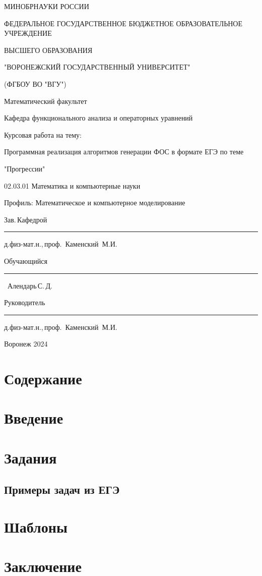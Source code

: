 \documentclass[oneside,final,12pt]{extarticle} %
\begin{document}
\begin{titlepage}
\centerline{МИНОБРНАУКИ РОССИИ}
\centerline{ФЕДЕРАЛЬНОЕ ГОСУДАРСТВЕННОЕ БЮДЖЕТНОЕ ОБРАЗОВАТЕЛЬНОЕ УЧРЕЖДЕНИЕ}
\centerline{ВЫСШЕГО ОБРАЗОВАНИЯ}
\centerline{"ВОРОНЕЖСКИЙ ГОСУДАРСТВЕННЫЙ УНИВЕРСИТЕТ"}
\centerline{(ФГБОУ ВО "ВГУ")}
\vfill
\centerline{Математический факультет}
\centerline{Кафедра функционального анализа и операторных уравнений}
\vfill
\centerline{Курсовая работа на тему:}
\centerline{Программная реализация алгоритмов генерации ФОС в формате ЕГЭ по теме}
\centerline{"Прогрессии"}
\centerline{02.03.01 Математика и компьютерные науки}
\centerline{Профиль: Математическое и компьютерное моделирование}
\vfill
\null\hfill
\begin{minipage}{0.85\textwidth}
	Зав.\,Кафедрой\,
	\rule{1.5cm}{0.25pt} д.физ-мат.н.,\,проф.\, Каменский~М.И.
	\par
	\medskip
	Обучающийся\,
	\rule{1.5cm}{0.25pt} \qquad\qquad\qquad\qquad\quad\quad\ Алендарь\,С.\,Д.
	\par
	\medskip
	Руководитель\,
	\rule{1.5cm}{0.25pt} д.физ-мат.н.,\,проф.\, Каменский~М.И.
	\par
	\medskip
\end{minipage}
\vfill
\centerline{Воронеж 2024}
\end{titlepage}
\setcounter{page}{2}

\section*{Содержание}
\newpage

\section*{Введение}
\newpage

\section{Задания}
\subsection{Примеры задач из ЕГЭ}
\newpage
\section{Шаблоны}
\newpage

\section*{Заключение}
\newpage

\begin{thebibliography}[]

\end{thebibliography}
\newpage
\appendix
\end{document}
